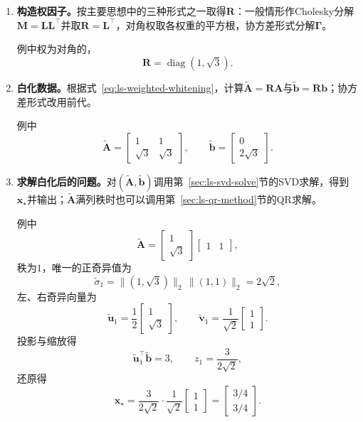 \begin{enumerate}
 \item \textbf{构造权因子。}按主要思想中的三种形式之一取得$\bm R$：一般情形作Cholesky分解$\bm M=\bm L\bm L^\top$并取$\bm R=\bm L^\top$，对角权取各权重的平方根，协方差形式分解$\bm\Gamma$。

 例中权为对角的，
 \[
  \bm R=\operatorname{diag}(1,\sqrt3) .
 \]

 \item \textbf{白化数据。}根据式~\eqref{eq:ls-weighted-whitening}，计算$\widetilde{\bm A}=\bm R\bm A$与$\widetilde{\bm b}=\bm R\bm b$；协方差形式改用前代。

 例中
 \[
  \widetilde{\bm A}=\begin{bmatrix}1&1\\\sqrt3&\sqrt3\end{bmatrix},\qquad
  \widetilde{\bm b}=\begin{bmatrix}0\\2\sqrt3\end{bmatrix}.
 \]

 \item \textbf{求解白化后的问题。}对$(\widetilde{\bm A},\widetilde{\bm b})$调用第~\ref{sec:ls-svd-solve}节的SVD求解，得到$\bm x_\star$并输出；$\widetilde{\bm A}$满列秩时也可以调用第~\ref{sec:ls-qr-method}节的QR求解。
 
 例中
 \[
  \widetilde{\bm A}=\begin{bmatrix}1\\\sqrt3\end{bmatrix}\begin{bmatrix}1&1\end{bmatrix},
 \]
 秩为$1$，唯一的正奇异值为
 \[
  \tilde\sigma_1=\lVert(1,\sqrt3)\rVert_2\,\lVert(1,1)\rVert_2=2\sqrt2,
 \]
 左、右奇异向量为
 \[
  \tilde{\bm u}_1=\frac12\begin{bmatrix}1\\\sqrt3\end{bmatrix},\qquad
  \tilde{\bm v}_1=\frac1{\sqrt2}\begin{bmatrix}1\\1\end{bmatrix}.
 \]
 投影与缩放得
 \[
  \tilde{\bm u}_1^\top\widetilde{\bm b}=3,\qquad
  z_1=\frac{3}{2\sqrt2},
 \]
 还原得
 \[
  \bm x_\star=\frac{3}{2\sqrt2}\cdot\frac1{\sqrt2}\begin{bmatrix}1\\1\end{bmatrix}=\begin{bmatrix}3/4\\3/4\end{bmatrix}.
 \]


\end{enumerate}
